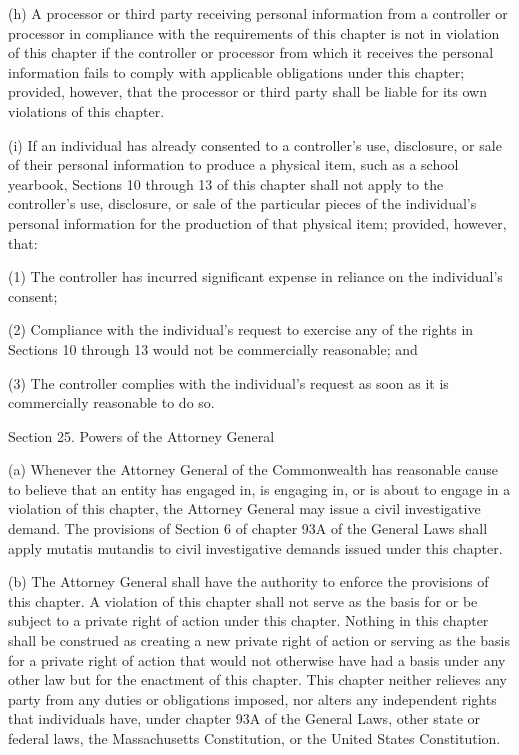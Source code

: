 (h) A processor or third party receiving personal information from a controller or processor in compliance with the requirements of this chapter is not in violation of this chapter if the controller or processor from which it receives the personal information fails to comply with applicable obligations under this chapter; provided, however, that the processor or third party shall be liable for its own violations of this chapter.

(i) If an individual has already consented to a controller’s use, disclosure, or sale of their personal information to produce a physical item, such as a school yearbook, Sections 10 through 13 of this chapter shall not apply to the controller’s use, disclosure, or sale of the particular pieces of the individual’s personal information for the production of that physical item; provided, however, that: 

(1) The controller has incurred significant expense in reliance on the individual’s consent;

(2) Compliance with the individual’s request to exercise any of the rights in Sections 10 through 13 would not be commercially reasonable; and 

(3) The controller complies with the individual’s request as soon as it is commercially reasonable to do so.

Section 25. Powers of the Attorney General

(a) Whenever the Attorney General of the Commonwealth has reasonable cause to believe that an entity has engaged in, is engaging in, or is about to engage in a violation of this chapter, the Attorney General may issue a civil investigative demand. The provisions of Section 6 of chapter 93A of the General Laws shall apply mutatis mutandis to civil investigative demands issued under this chapter.

(b) The Attorney General shall have the authority to enforce the provisions of this chapter. A violation of this chapter shall not serve as the basis for or be subject to a private right of action under this chapter. Nothing in this chapter shall be construed as creating a new private right of action or serving as the basis for a private right of action that would not otherwise have had a basis under any other law but for the enactment of this chapter. This chapter neither relieves any party from any duties or obligations imposed, nor alters any independent rights that individuals have, under chapter 93A of the General Laws, other state or federal laws, the Massachusetts Constitution, or the United States Constitution.

